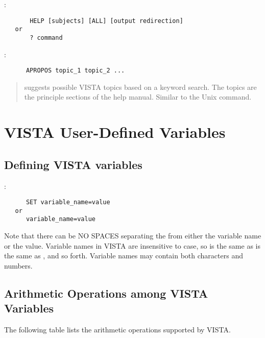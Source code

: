 \noindent {}:
\begin{verbatim}
       HELP [subjects] [ALL] [output redirection]
   or
       ? command
\end{verbatim}

\noindent {}:
\begin{verbatim}
      APROPOS topic_1 topic_2 ...
\end{verbatim}
\begin{quote}
       suggests possible VISTA  topics based
      on a keyword search.   The topics are the principle sections of
      the help manual.  Similar to the Unix  command.
\end{quote}


\section{VISTA User-Defined Variables}

\subsection{Defining VISTA variables}

:
\begin{verbatim}
      SET variable_name=value
   or
      variable_name=value
\end{verbatim}

\noindent Note that there can be NO SPACES separating the \comm{=} from either
the variable name or the value.  Variable names in VISTA are insensitive to
case, so  is the same as  is the same as ,
and so forth.  Variable names may contain both characters and numbers.

\subsection{Arithmetic Operations among VISTA Variables}

The following table lists the arithmetic operations supported by VISTA.

